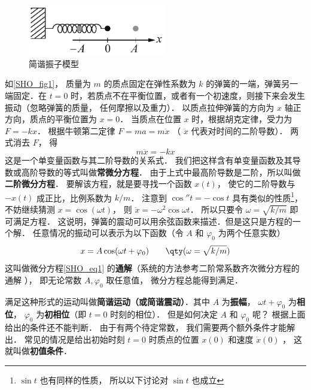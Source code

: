 

\begin{figure}[ht]
\centering
\includegraphics[width=6cm]{./figures/SHO.pdf}
\caption{简谐振子模型} \label{SHO_fig1}
\end{figure}

如\autoref{SHO_fig1}， 质量为 $m$ 的质点固定在弹性系数为 $k$ 的弹簧的一端，弹簧另一端固定．在 $t = 0$ 时，若质点不在平衡位置，或者有一个初速度，则接下来会发生振动（忽略弹簧的质量， 任何摩擦以及重力）． 以质点拉伸弹簧的方向为 $x$ 轴正方向，质点的平衡位置为 $x = 0$． 当质点在位置 $x$ 时，根据胡克定律，受力为 $F =  - kx$． 根据牛顿第二定律 $F = ma = m\ddot x$ （ $\ddot x$ 代表对时间的二阶导数）．  两式消去 $F$， 得
\begin{equation}\label{SHO_eq1}
m\ddot x =  - kx
\end{equation}
这是一个单变量函数与其二阶导数的关系式． 我们把这样含有单变量函数及其导数或高阶导数的等式叫做\textbf{常微分方程}． 由于上式中最高阶导数是二阶，所以叫做\textbf{二阶微分方程}． 要解该方程，就是要寻找一个函数 $x(t)$， 使它的二阶导数与 $- x(t)$ 成正比，比例系数为 $k/m$． 注意到 $\cos'' t =  - \cos t$ 具有类似的性质\footnote{$\sin t$ 也有同样的性质， 所以以下讨论对 $\sin t$ 也成立}，不妨继续猜测 $x = \cos(\omega t)$， 则 $\ddot x =  - {\omega ^2}\cos \omega t$． 所以只要令 $\omega = \sqrt{k/m}$ 即可满足方程． 这说明，弹簧的震动可以用余弦函数来描述．但是这只是方程的一个解． 任意情况的振动可以表示为以下函数（令 $A$ 和 $\varphi_0$ 为两个任意实数）
\begin{equation}\label{SHO_eq2}
x = A\cos(\omega t + \varphi _0)  \qquad \qty(\omega  = \sqrt{k/m})
\end{equation}
这叫做微分方程\autoref{SHO_eq1} 的\textbf{通解}（系统的方法参考二阶常系数齐次微分方程的通解
）， 即无论常数 $A, \varphi_0$ 取任意值， 微分方程总能得到满足．

满足这种形式的运动叫做\textbf{简谐运动（或简谐震动）}．其中 $A$ 为\textbf{振幅}， $\omega t + \varphi _0$ 为\textbf{相位}， $\varphi _0$ 为\textbf{初相位}（即 $t = 0$ 时刻的相位）． 但是如何决定 $A$ 和 $\varphi _0$ 呢？ 根据上面给出的条件还不能判断． 由于有两个待定常数， 我们需要两个额外条件才能解出． 常见的情况是给出初始时刻 $t = 0$ 时质点的位置 $x(0)$ 和速度 $\dot x(0)$ ， 这就叫做\textbf{初值条件}．

